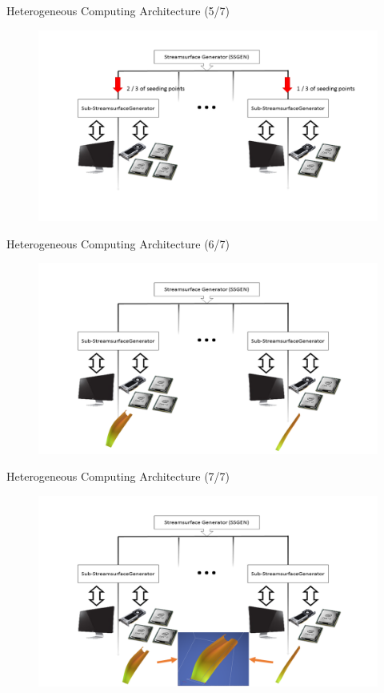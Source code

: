 \documentclass{beamer}
\begin{document}
\begin{frame}{Heterogeneous Computing Architecture (5/7)}
	\begin{figure}
		\includegraphics[width=\linewidth]{figures/MAarch5.PNG}
	\end{figure}
\end{frame}

\begin{frame}{Heterogeneous Computing Architecture (6/7)}
	\begin{figure}
		\includegraphics[width=\linewidth]{figures/MAarch6.PNG}
	\end{figure}
\end{frame}

\begin{frame}{Heterogeneous Computing Architecture (7/7)}
	\begin{figure}
		\includegraphics[width=\linewidth]{figures/MAarch7.PNG}
	\end{figure}
\end{frame}
\end{document}
